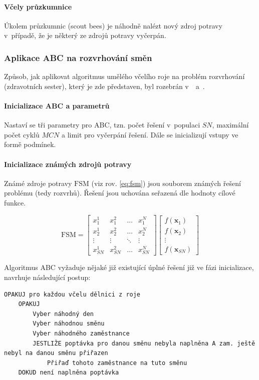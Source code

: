 \documentclass[twoside]{ctuthesis}
\begin{document}
\paragraph{Včely průzkumnice}
Úkolem průzkumnic (scout bees) je náhodně nalézt nový zdroj potravy v~případě, že je některý ze zdrojů potravy vyčerpán.

\subsubsection{Aplikace ABC na rozvrhování směn}
Způsob, jak aplikovat algoritmus umělého včelího roje na problém roz\-vr\-ho\-vá\-ní (zdravotních sester), který je zde představen, byl rozebrán v~\cite{buyukozkan2014applicability}~a~\cite{awadallah2015hybrid}.

\paragraph{Inicializace ABC a parametrů}
Nastaví se tři parametry pro ABC, tzn. počet řešení v~populaci $SN$, maximální počet cyklů $MCN$ a limit pro vyčerpání řešení. Dále se inicializují vstupy ve formě podmínek.

\paragraph{Inicializace známých zdrojů potravy}
Známé zdroje potravy $\boldsymbol{\mathrm{FSM}}$ (viz rov. \ref{eq:fsm}) jsou souborem známých řešení problému (tedy rozvrhů). Řešení jsou uchována seřazená dle hodnoty cílové funkce.

\begin{equation}
	\label{eq:fsm}
	\boldsymbol{\mathrm{FSM}} =
	\begin{bmatrix}
			x_1^1 & x_1^2 & \ldots & x_1^{N} \\
			x_2^1 & x_2^2 & \ldots & x_2^{N} \\
			\vdots & \vdots & \ddots & \vdots \\
			x_{SN}^1 & x_{SN}^2 & \ldots & x_{SN}^{N}
	\end{bmatrix}
	\begin{bmatrix}
			f(\boldsymbol{x}_1)\\
			f(\boldsymbol{x}_2)\\
			\vdots \\
			f(\boldsymbol{x}_{SN})
	\end{bmatrix}
\end{equation}

Algoritmus ABC vyžaduje nějaké již existující úplné řešení již ve fázi inicializace, \cite{buyukozkan2014applicability} navrhuje následující postup:
\begin{lstlisting}[caption={Pseudokód pro ABC}]
OPAKUJ pro každou včelu dělnici z roje
	OPAKUJ
		Vyber náhodný den
		Vyber náhodnou směnu
		Vyber náhodného zaměstnance
		JESTLIŽE poptávka pro danou směnu nebyla naplněna A zam. ještě nebyl na danou směnu přiřazen
			Přiřaď tohoto zaměstnance na tuto směnu
	DOKUD není naplněna poptávka
\end{lstlisting}
\end{document}
